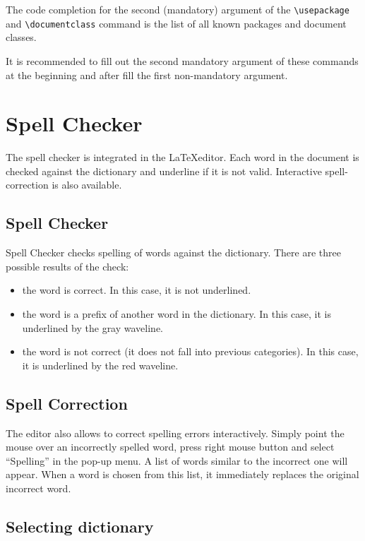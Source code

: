 \documentclass{article}
\begin{document}
The code completion for the second (mandatory) argument of the \verb+\usepackage+
and \verb+\documentclass+ command is the list of all known packages and document
classes.

It is recommended to fill out the second mandatory argument of these
commands at the beginning and after fill the first non-mandatory argument.

\section{Spell Checker}
\label{sec:spell}

The spell checker is integrated in the \LaTeX editor. Each word in the document
is checked against the dictionary and underline if it is not valid. Interactive
spell-correction is also available.

\subsection{Spell Checker}

\label{ssec:spell:checker}

Spell Checker checks spelling of words against the dictionary. There are three
possible results of the check:

\begin{itemize}
\item{the word is correct. In this case, it is
not underlined.}
\item{the word is a prefix of another word in the dictionary. In this case, it is
underlined by the gray waveline.}
\item{the word is not correct (it does not fall into previous categories).
In this case, it is underlined by the red waveline.}
\end{itemize}

\subsection{Spell Correction}

\label{ssec:spell:correction}

The editor also allows to correct spelling errors interactively. Simply point
the mouse over an incorrectly spelled word, press right mouse button and
select ``Spelling'' in the pop-up menu. A list of words similar to the incorrect
one will appear. When a word is chosen from this list, it immediately replaces the
original incorrect word.

\subsection{Selecting dictionary}
\end{document}
